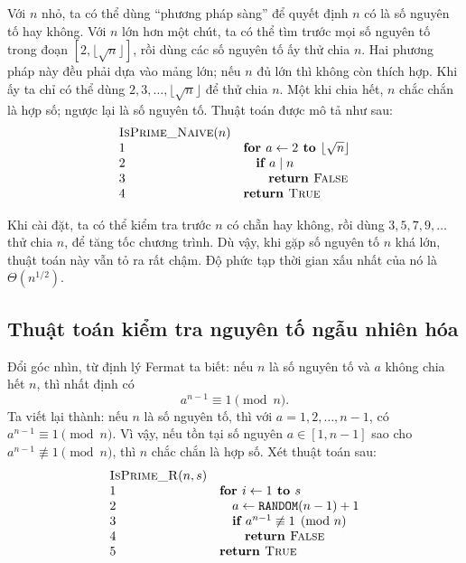 \documentclass[11pt]{article}
\begin{document}
Với \(n\) nhỏ, ta có thể dùng ``phương pháp sàng'' để quyết định \(n\) có là
số nguyên tố hay không. Với \(n\) lớn hơn một chút, ta có thể tìm trước mọi số
nguyên tố trong đoạn \([2,\lfloor\sqrt n\rfloor]\), rồi dùng các số nguyên tố
ấy thử chia \(n\). Hai phương pháp này đều phải dựa vào mảng lớn; nếu \(n\)
đủ lớn thì không còn thích hợp. Khi ấy ta chỉ có thể dùng
\(2,3,\ldots,\lfloor\sqrt n\rfloor\) để thử chia \(n\). Một khi chia hết, \(n\)
chắc chắn là hợp số; ngược lại là số nguyên tố. Thuật toán được mô tả như sau:
\[
\begin{array}{ll}
\textsc{IsPrime\_Naive}(n)\\
1 & \textbf{for } a \leftarrow 2 \textbf{ to } \lfloor\sqrt n\rfloor\\
2 & \quad \textbf{if } a\mid n\\
3 & \quad\quad \textbf{return } \textsc{False}\\
4 & \textbf{return } \textsc{True}
\end{array}
\]

Khi cài đặt, ta có thể kiểm tra trước \(n\) có chẵn hay không, rồi dùng
\(3,5,7,9,\ldots\) thử chia \(n\), để tăng tốc chương trình. Dù vậy, khi gặp
số nguyên tố \(n\) khá lớn, thuật toán này vẫn tỏ ra rất chậm. Độ phức tạp
thời gian xấu nhất của nó là \(\Theta(n^{1/2})\).

\subsection{Thuật toán kiểm tra nguyên tố ngẫu nhiên hóa}

Đổi góc nhìn, từ định lý Fermat ta biết: nếu \(n\) là số nguyên tố và \(a\)
không chia hết \(n\), thì nhất định có
\[
  a^{n-1}\equiv 1 \pmod n.
\]
Ta viết lại thành: nếu \(n\) là số nguyên tố, thì với
\(a=1,2,\ldots,n-1\), có \(a^{n-1}\equiv1\pmod n\). Vì vậy, nếu tồn tại số
nguyên \(a\in[1,n-1]\) sao cho \(a^{n-1}\not\equiv1\pmod n\), thì \(n\) chắc
chắn là hợp số. Xét thuật toán sau:
\[
\begin{array}{ll}
\textsc{IsPrime\_R}(n,s)\\
1 & \textbf{for } i \leftarrow 1 \textbf{ to } s\\
2 & \quad a \leftarrow \texttt{RANDOM}(n-1)+1\\
3 & \quad \textbf{if } a^{n-1}\not\equiv 1 \pmod n\\
4 & \quad\quad \textbf{return } \textsc{False}\\
5 & \textbf{return } \textsc{True}
\end{array}
\]
\end{document}
